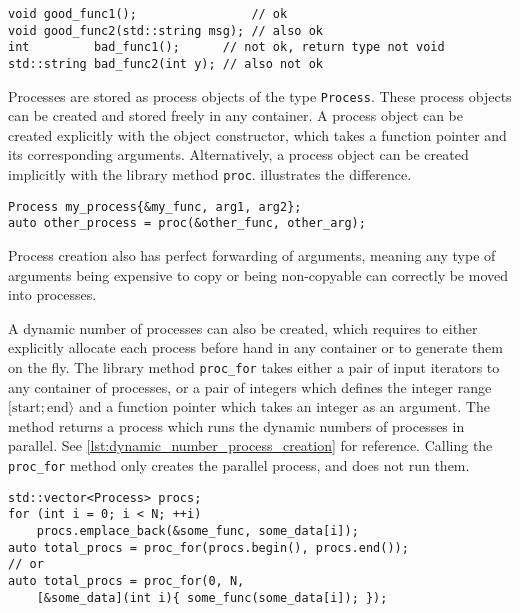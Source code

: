 \begin{lstfloat}
\begin{lstlisting}[caption={Different function prototypes which do and do not qualify as a process.}, label={lst:code_example_process_func}, style={CustomC++}, xleftmargin={2em}]
void good_func1();                // ok
void good_func2(std::string msg); // also ok
int         bad_func1();      // not ok, return type not void
std::string bad_func2(int y); // also not ok
\end{lstlisting}
\end{lstfloat}

Processes are stored as process objects of the type \lstinline[style={CustomC++}]|Process|. These process objects can be created and stored freely in any container. A process object can be created explicitly with the object constructor, which takes a function pointer and its corresponding arguments. Alternatively, a process object can be created implicitly with the library method \lstinline[style={CustomC++}]|proc|.  illustrates the difference.

\begin{lstfloat}[h!]
\begin{lstlisting}[caption={Process creation.}, label={lst:process_creation}, style={CustomC++}, xleftmargin={2em}]
Process my_process{&my_func, arg1, arg2};
auto other_process = proc(&other_func, other_arg);
\end{lstlisting}
\end{lstfloat}

Process creation also has perfect forwarding of arguments, meaning any type of arguments being expensive to copy or being non\hyp{}copyable can correctly be moved into processes.

A dynamic number of processes can also be created, which requires to either explicitly allocate each process before hand in any container or to generate them on the fly. The library method \lstinline[style={CustomC++}]|proc_for| takes either a pair of input iterators to any container of processes, or a pair of integers which defines the integer range $[\text{start};\text{end}\rangle$ and a function pointer which takes an integer as an argument. The method returns a process which runs the dynamic numbers of processes in parallel. See \cref{lst:dynamic_number_process_creation} for reference. Calling the \lstinline[style={CustomC++}]|proc_for| method only creates the parallel process, and does not run them.

\begin{lstfloat}[h!]
\begin{lstlisting}[caption={Creating a dynamic number of processes.}, label={lst:dynamic_number_process_creation}, style={CustomC++}, xleftmargin={2em}]
std::vector<Process> procs;
for (int i = 0; i < N; ++i) 
    procs.emplace_back(&some_func, some_data[i]);
auto total_procs = proc_for(procs.begin(), procs.end());
// or
auto total_procs = proc_for(0, N,
    [&some_data](int i){ some_func(some_data[i]); });
\end{lstlisting}
\end{lstfloat}

